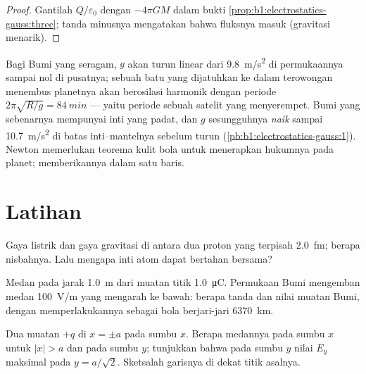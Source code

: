 \begin{proof}
Gantilah $Q/\varepsilon_0$ dengan $-4\pi GM$ dalam bukti
\cref{prop:b1:electrostatics-gauss:three}; tanda minusnya mengatakan bahwa fluksnya
masuk (gravitasi menarik).
\end{proof}

\begin{example}\label{ex:b1:electrostatics-gauss:earth}
Bagi Bumi yang seragam, $g$ akan turun linear dari \qty{9.8}{m/s^2} di
permukaannya sampai nol di pusatnya; sebuah batu yang dijatuhkan ke dalam terowongan menembus
planetnya akan berosilasi harmonik dengan periode $2\pi\sqrt{R/g} =
\qty{84}{min}$ --- yaitu periode sebuah satelit yang menyerempet. Bumi yang sebenarnya mempunyai
inti yang padat, dan $g$ sesungguhnya \emph{naik} sampai \qty{10.7}{m/s^2} di
batas inti--mantelnya sebelum turun (\cref{pb:b1:electrostatics-gauss:1}).
Newton memerlukan teorema kulit bola untuk menerapkan hukumnya pada planet;  memberikannya dalam satu baris.
\end{example}

\section{Latihan}

\begin{exercise}[$\star$]\label{exo:b1:electrostatics-gauss:1}
Gaya listrik dan gaya gravitasi di antara dua proton yang terpisah
\qty{2.0}{fm}; berapa nisbahnya. Lalu mengapa inti atom dapat bertahan bersama?
\end{exercise}

\begin{exercise}[$\star$]\label{exo:b1:electrostatics-gauss:2}
Medan pada jarak \qty{1.0}{m} dari muatan titik \qty{1.0}{\micro C}. Permukaan Bumi
mengemban medan \qty{100}{V/m} yang mengarah ke bawah: berapa tanda dan nilai
muatan Bumi, dengan memperlakukannya sebagai bola berjari-jari \qty{6370}{km}.
\end{exercise}

\begin{exercise}[$\star$]\label{exo:b1:electrostatics-gauss:3}
Dua muatan $+q$ di $x = \pm a$ pada sumbu $x$. Berapa medannya pada sumbu $x$
untuk $|x| > a$ dan pada sumbu $y$; tunjukkan bahwa pada sumbu $y$ nilai $E_y$
maksimal pada $y = a/\sqrt2$. Sketsalah garisnya di dekat titik asalnya.
\end{exercise}

